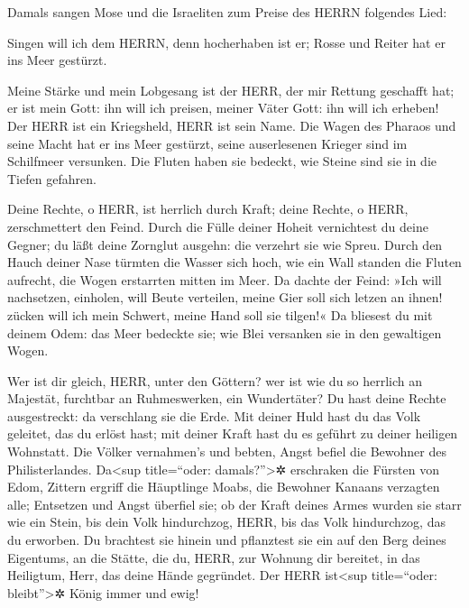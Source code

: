 Damals sangen Mose und die Israeliten zum Preise des
HERRN folgendes Lied:

Singen will ich dem HERRN, denn hocherhaben ist er; Rosse und Reiter hat
er ins Meer gestürzt.

 Meine Stärke und mein Lobgesang ist der HERR, der mir
Rettung geschafft hat; er ist mein Gott: ihn will ich preisen, meiner
Väter Gott: ihn will ich erheben!  Der HERR ist ein
Kriegsheld, HERR ist sein Name.  Die Wagen des Pharaos und
seine Macht hat er ins Meer gestürzt, seine auserlesenen Krieger sind im
Schilfmeer versunken.  Die Fluten haben sie bedeckt, wie
Steine sind sie in die Tiefen gefahren.

 Deine Rechte, o HERR, ist herrlich durch Kraft; deine
Rechte, o HERR, zerschmettert den Feind.  Durch die Fülle
deiner Hoheit vernichtest du deine Gegner; du läßt deine Zornglut
ausgehn: die verzehrt sie wie Spreu.  Durch den Hauch
deiner Nase türmten die Wasser sich hoch, wie ein Wall standen die
Fluten aufrecht, die Wogen erstarrten mitten im Meer.  Da
dachte der Feind: »Ich will nachsetzen, einholen, will Beute verteilen,
meine Gier soll sich letzen an ihnen! zücken will ich mein Schwert,
meine Hand soll sie tilgen!«  Da bliesest du mit deinem
Odem: das Meer bedeckte sie; wie Blei versanken sie in den gewaltigen
Wogen.

 Wer ist dir gleich, HERR, unter den Göttern? wer ist wie
du so herrlich an Majestät, furchtbar an Ruhmeswerken, ein Wundertäter?
 Du hast deine Rechte ausgestreckt: da verschlang sie die
Erde.  Mit deiner Huld hast du das Volk geleitet, das du
erlöst hast; mit deiner Kraft hast du es geführt zu deiner heiligen
Wohnstatt.  Die Völker vernahmen's und bebten, Angst
befiel die Bewohner des Philisterlandes.  Da\textless sup
title=``oder: damals?''\textgreater✲ erschraken die Fürsten von Edom,
Zittern ergriff die Häuptlinge Moabs, die Bewohner Kanaans verzagten
alle;  Entsetzen und Angst überfiel sie; ob der Kraft
deines Armes wurden sie starr wie ein Stein, bis dein Volk hindurchzog,
HERR, bis das Volk hindurchzog, das du erworben.  Du
brachtest sie hinein und pflanztest sie ein auf den Berg deines
Eigentums, an die Stätte, die du, HERR, zur Wohnung dir bereitet, in das
Heiligtum, Herr, das deine Hände gegründet.  Der HERR
ist\textless sup title=``oder: bleibt''\textgreater✲ König immer und
ewig!

